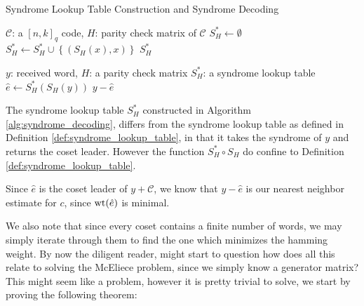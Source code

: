 \begin{algorithm}[H]
\caption{Syndrome Lookup Table Construction and Syndrome Decoding}\label{alg:syndrome_decoding}
\begin{algorithmic}
   {$\mathcal{C}$: a $[n,k]_q$ code, $H$: parity check matrix of $\mathcal{C}$}
  \State $S_H^{*} \gets \emptyset$ 
      \State $S^{*}_H \gets S^{*}_H \cup \left\{(S_H(x), x)\right\}$
        \State \Return $S_H^{*}$
      \EndIf
    \EndIf
  \EndFor
  \EndFor
  \EndProcedure
  \newline

   {$y$: received word, $H$: a parity check matrix
  \newline{}$S_H^{*}$: a syndrome lookup table}
    \State $\hat{e} \gets S_H^{*}(S_H(y))$
    \State \Return $y - \hat{e}$
  \EndProcedure
\end{algorithmic}
\end{algorithm}
\begin{remark}
The syndrome lookup table $S^*_H$ constructed in Algorithm \ref{alg:syndrome_decoding}, differs from the syndrome lookup table as defined in Definition \ref{def:syndrome_lookup_table}, in that it takes the syndrome of $y$ and returns the coset leader. However the function $S_H^{*} \circ S_H$ do confine to Definition \ref{def:syndrome_lookup_table}.
\end{remark}
\begin{remark}
  Since $\hat{e}$ is the coset leader of $y + \mathcal{C}$, we know that $y - \hat{e}$ is our nearest neighbor estimate for $c$, since $\mathrm{wt}(\hat{e})$ is minimal.
\end{remark}
We also note that since every coset contains a finite number of words, we may simply iterate through them to find the one which minimizes the hamming weight. By now the diligent reader, might start to question how does all this relate to solving the McEliece problem, since we simply know a generator matrix? This might seem like a problem, however it is pretty trivial to solve, we start by proving the following theorem:

